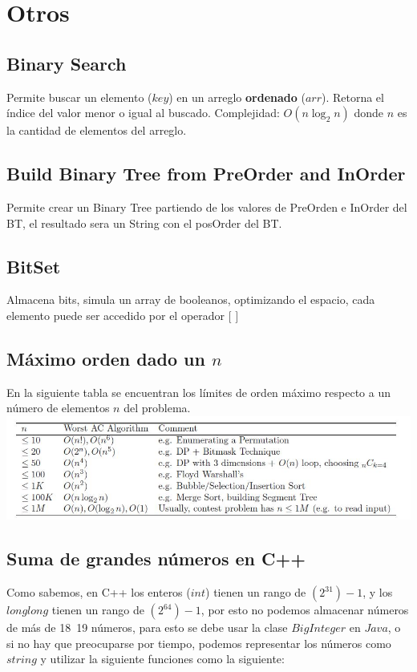 \documentclass[10pt,letterpaper,twocolumn]{article}
\newcommand{\source}[1]{
	
	\dotfill
}
\begin{document}
\section{Otros}
	\subsection{Binary Search}
		Permite buscar un elemento ($key$) en un arreglo \textbf{ordenado} ($arr$). Retorna el índice del valor menor o igual al buscado.
		Complejidad: $O(n \log_2 n)$ donde $n$ es la cantidad de elementos del arreglo.\\
		\source{./src/binarySearch.cpp}
	\subsection{Build Binary Tree from PreOrder and InOrder}
		Permite crear un Binary Tree partiendo de los valores de PreOrden e InOrder del BT, el resultado sera un String con el posOrder del BT.
		\source{./src/build-BT-from-pre-in.cpp}
	\subsection{BitSet}
		Almacena bits, simula un array de booleanos, optimizando el espacio, cada elemento puede ser accedido por el operador $[$ $]$\\
		\source{./src/bitset.cpp}
	\subsection{Máximo orden dado un $n$}
		En la siguiente tabla se encuentran los límites de orden máximo respecto a un número de elementos $n$ del problema.\\
		\includegraphics[scale=0.5]{./src/maxorder.jpg}
	\subsection{Suma de grandes números en C++}
		Como sabemos, en C++ los enteros ($int$) tienen un rango de $(2^31)-1$, y los $long long$ tienen un rango de $(2^64)-1$, por esto no podemos almacenar números de más de 18~19 números, para esto se debe usar la clase $BigInteger$ en $Java$, o si no hay que preocuparse por tiempo, podemos representar los números como $string$ y utilizar la siguiente funciones como la siguiente:
		\source{./src/bigIntegerCpp.cpp}
\end{document}
